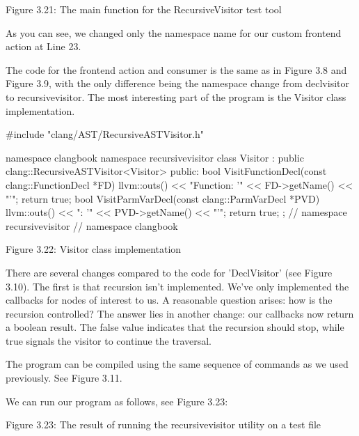\begin{center}
Figure 3.21: The main function for the RecursiveVisitor test tool
\end{center}

As you can see, we changed only the namespace name for our custom frontend action at Line 23.

The code for the frontend action and consumer is the same as in Figure 3.8 and Figure 3.9, with the only difference being the namespace change from declvisitor to recursivevisitor. The most interesting part of the program is the Visitor class implementation.

\begin{cpp}
#include "clang/AST/RecursiveASTVisitor.h"

namespace clangbook {
namespace recursivevisitor {
class Visitor : public clang::RecursiveASTVisitor<Visitor> {
public:
  bool VisitFunctionDecl(const clang::FunctionDecl *FD) {
    llvm::outs() << "Function: '" << FD->getName() << "'\n";
    return true;
  }
  bool VisitParmVarDecl(const clang::ParmVarDecl *PVD) {
    llvm::outs() << "\tParameter: '" << PVD->getName() << "'\n";
    return true;
  }
};
} // namespace recursivevisitor
} // namespace clangbook
\end{cpp}

\begin{center}
Figure 3.22: Visitor class implementation
\end{center}

There are several changes compared to the code for 'DeclVisitor' (see Figure 3.10). The first is that recursion isn't implemented. We've only implemented the callbacks for nodes of interest to us. A reasonable question arises: how is the recursion controlled? The answer lies in another change: our callbacks now return a boolean result. The false value indicates that the recursion should stop, while true signals the visitor to continue the traversal.

The program can be compiled using the same sequence of commands as we used previously. See Figure 3.11.

We can run our program as follows, see Figure 3.23:


\begin{center}
Figure 3.23: The result of running the recursivevisitor utility on a test file
\end{center}

